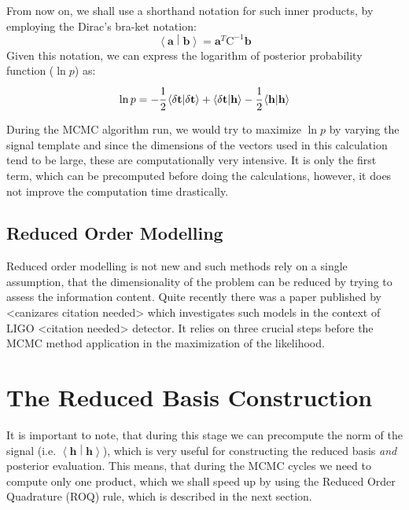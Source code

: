 \documentclass{scrreprt}
\renewcommand{\vec}[1]{\ensuremath{\mathbf{#1}}}
\newcommand{\arr}[1]{\ensuremath{\mathrm{#1}}}
\newcommand{\braket}[2]{\ensuremath{\left\langle #1 \middle| #2 \right\rangle}}
\begin{document}
    From now on, we shall use a shorthand notation for such inner products, by
    employing the Dirac's bra-ket notation:
    \begin{equation}
        \braket{\vec{a}}{\vec{b}} = \vec{a}^{T} \arr{C}^{-1} \vec{b} 
    \end{equation}
    Given this notation, we can express the logarithm of posterior probability
    function ($\ln p$) as:
    \begin{equation}
        \ln p = -\cfrac{1}{2} \braket{\delta\vec{t}}{\delta\vec{t}} 
        + \braket{\delta\vec{t}}{\vec{h}} 
        -\cfrac{1}{2} \braket{\vec{h}}{\vec{h}}
    \end{equation}

    During the MCMC algorithm run, we would try to maximize $\ln p$ by varying the
    signal template and since the dimensions of the vectors used in this
    calculation tend to be large, these are computationally very intensive.
    It is only the first term, which can be precomputed before doing the
    calculations, however, it does not improve the computation time drastically.


    \section{Reduced Order Modelling}

    Reduced order modelling is not new and such methods rely on a single
    assumption, that the dimensionality of the problem can be reduced by trying to
    assess the information content.
    Quite recently there was a paper published by <canizares citation needed>
    which investigates such models in the context of LIGO <citation needed>
    detector.
    It relies on three crucial steps before the MCMC method application in the
    maximization of the likelihood.


    \chapter{The Reduced Basis Construction}


    It is important to note, that during this stage we can precompute the norm of
    the signal (i.e. \braket{\vec{h}}{\vec{h}}), which is very useful for
    constructing the reduced basis \emph{and} posterior evaluation.
    This means, that during the MCMC cycles we need to compute only one product,
    which we shall speed up by using the Reduced Order Quadrature (ROQ) rule,
    which is described in the next section.
\end{document}

